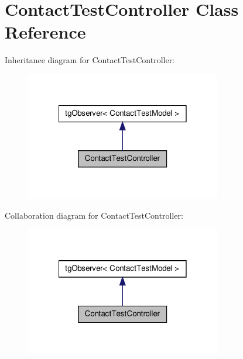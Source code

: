 \hypertarget{class_contact_test_controller}{\section{Contact\-Test\-Controller Class Reference}
\label{class_contact_test_controller}
}


Inheritance diagram for Contact\-Test\-Controller\-:\nopagebreak
\begin{figure}[H]
\begin{center}
\leavevmode
\includegraphics[width=242pt]{class_contact_test_controller__inherit__graph}
\end{center}
\end{figure}


Collaboration diagram for Contact\-Test\-Controller\-:\nopagebreak
\begin{figure}[H]
\begin{center}
\leavevmode
\includegraphics[width=242pt]{class_contact_test_controller__coll__graph}
\end{center}
\end{figure}
